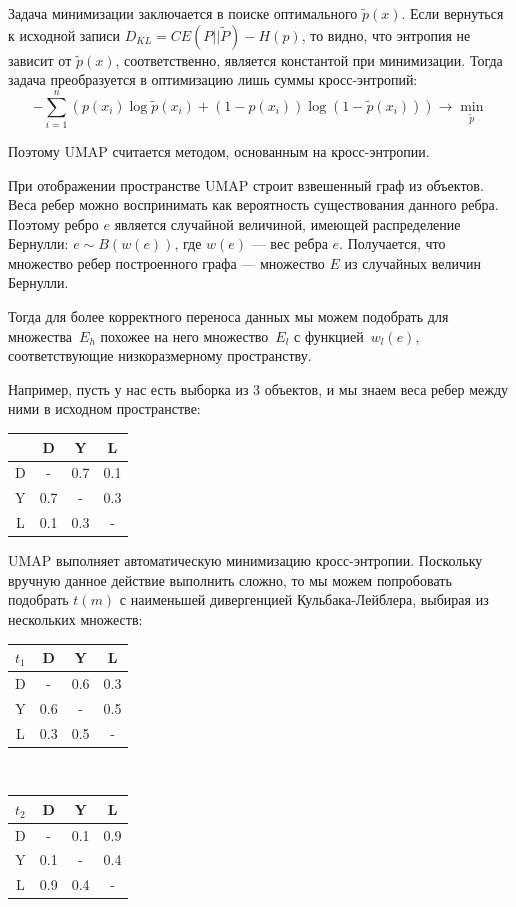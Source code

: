 Задача минимизации заключается в поиске оптимального $\tilde p(x)$. Если вернуться к исходной записи $D_{KL} = CE(P||\tilde P) - H(p)$, то видно, что энтропия не зависит от $\tilde p(x)$, соответственно, является константой при минимизации. Тогда задача преобразуется в оптимизацию лишь суммы кросс-энтропий:
\[- \sum_{i=1}^n \left(p(x_i)\log \tilde p(x_i) + (1 - p(x_i))\log (1 - \tilde p(x_i))\right) \rightarrow \min_{\tilde p}\]

Поэтому UMAP считается методом, основанным на кросс-энтропии.

При отображении пространстве UMAP строит взвешенный граф из объектов. Веса ребер можно воспринимать как вероятность существования данного ребра. Поэтому ребро $e$ является случайной величиной, имеющей распределение Бернулли: $e \sim B(w(e))$, где $w(e)$ --- вес ребра $e$. Получается, что множество ребер построенного графа --- множество $E$ из случайных величин Бернулли.

Тогда для более корректного переноса данных мы можем подобрать для множества~$E_h$ похожее на него множество~$E_l$ с функцией~$w_l(e)$, соответствующие низкоразмерному пространству.

Например, пусть у нас есть выборка из 3 объектов, и мы знаем веса ребер между ними в исходном пространстве:
\begin{center}
	\begin{tabular}{|c||c|c|c|}
		\hline
		& D & Y & L\\
		\hline
		\hline
		D & - & 0.7 & 0.1\\
		\hline
		Y & 0.7 & - & 0.3\\
		\hline
		L & 0.1 & 0.3 & -\\
		\hline
	\end{tabular}
\end{center}

UMAP выполняет автоматическую минимизацию кросс-энтропии. Поскольку вручную данное действие выполнить сложно, то мы можем попробовать подобрать $t(m)$ с наименьшей дивергенцией Кульбака-Лейблера, выбирая из нескольких множеств:

\begin{center}
	\begin{multicols}{2}
		\begin{tabular}{|c||c|c|c|}
			\hline
			$t_1$ & D & Y & L\\
			\hline
			\hline
			D & - & 0.6 & 0.3\\
			\hline
			Y & 0.6 & - & 0.5\\
			\hline
			L & 0.3 & 0.5 & -\\
			\hline
		\end{tabular}\\
		\begin{tabular}{|c||c|c|c|}
			\hline
			$t_2$ & D & Y & L\\
			\hline
			\hline
			D & - & 0.1 & 0.9\\
			\hline
			Y & 0.1 & - & 0.4\\
			\hline
			L & 0.9 & 0.4 & -\\
			\hline
		\end{tabular}
	\end{multicols}
\end{center}

